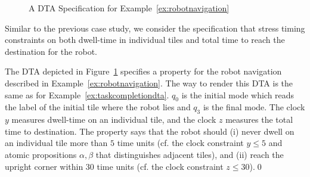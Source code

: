 \begin{figure}
\centering
{}
\caption{A DTA Specification for Example~\ref{ex:robotnavigation}}
\label{fig:dtarobotnavigation}
\end{figure}

Similar to the previous case study, we consider the specification that stress timing constraints on both dwell-time in individual tiles and total time to reach the destination for the robot.
\vspace{-0.8em}
\begin{example}
The DTA depicted in Figure~\ref{fig:dtarobotnavigation} specifies a property for the robot navigation described in Example~\ref{ex:robotnavigation}.
The way to render this DTA is the same as for Example~\ref{ex:taskcompletiondta}.
$q_0$ is the initial mode which reads the label of the initial tile where the robot lies and $q_3$ is the final mode.
The clock $y$ measures dwell-time on an individual tile, and the clock $z$ measures the total time to destination.
The property says that the robot should (i) never dwell on an individual tile more than $5$ time units (cf. the clock constraint $y\le 5$ and atomic propositions $\alpha,\beta$ that distinguishes adjacent tiles), and (ii) reach the upright corner within 30 time units (cf. the clock constraint $z\le 30$).\qed
\end{example}
\vspace{-0.8em}